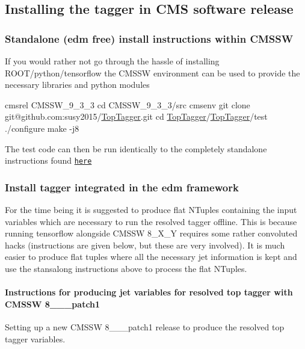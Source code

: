 \subsection*{Installing the tagger in C\-M\-S software release}

\subsubsection*{Standalone (edm free) install instructions within C\-M\-S\-S\-W}

If you would rather not go through the hassle of installing R\-O\-O\-T/python/tensorflow the C\-M\-S\-S\-W environment can be used to provide the necessary libraries and python modules


\begin{DoxyCode}
cmsrel CMSSW\_9\_3\_3
cd CMSSW\_9\_3\_3/src
cmsenv
git clone git@github.com:susy2015/\hyperlink{classTopTagger}{TopTagger}.git
cd \hyperlink{classTopTagger}{TopTagger}/\hyperlink{classTopTagger}{TopTagger}/test
./configure
make -j8 
\end{DoxyCode}


The test code can then be run identically to the completely standalone instructions found \href{../README.md#running-the-example}{\tt here}

\subsubsection*{Install tagger integrated in the edm framework}

For the time being it is suggested to produce flat N\-Tuples containing the input variables which are necessary to run the resolved tagger offline. This is because running tensorflow alongside C\-M\-S\-S\-W 8\-\_\-\-X\-\_\-\-Y requires some rather convoluted hacks (instructions are given below, but these are very involved). It is much easier to produce flat tuples where all the necessary jet information is kept and use the stansalong instructions above to process the flat N\-Tuples.

\paragraph*{Instructions for producing jet variables for resolved top tagger with C\-M\-S\-S\-W 8\-\_\-\_\-\_\-patch1}

Setting up a new C\-M\-S\-S\-W 8\-\_\-\_\-\_\-patch1 release to produce the resolved top tagger variables.


